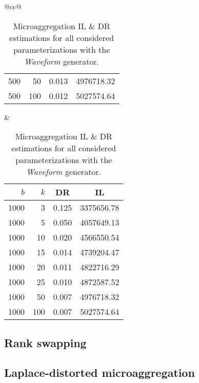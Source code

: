 \begin{table}[H]
\begin{tabular}{@{}cc@{}}
\begin{tabular}{@{}rrrr@{}}
			500  & 50  & 0.013 & 4976718.32 \\
			500  & 100 & 0.012 & 5027574.64 \\ \bottomrule
		\end{tabular}
		&
		\begin{tabular}{@{}rrrr@{}}
			\toprule
			$b$ & $k$ & \multicolumn{1}{c}{DR} & \multicolumn{1}{c}{IL} \\ \midrule
			1000 & 3   & 0.125 & 3375656.78 \\
			1000 & 5   & 0.050 & 4057649.13 \\
			1000 & 10  & 0.020 & 4566550.54 \\
			1000 & 15  & 0.014 & 4739204.47 \\
			1000 & 20  & 0.011 & 4822716.29 \\
			1000 & 25  & 0.010 & 4872587.52 \\
			1000 & 50  & 0.007 & 4976718.32 \\
			1000 & 100 & 0.007 & 5027574.64 \\ \bottomrule
		\end{tabular}
	\end{tabular}
	\caption[Microaggregation DR \& IL estimations (RandomRBF).]{Microaggregation IL \& DR estimations for all considered parameterizations with the \textit{Waveform} generator.}
	\label{table:results-wave-microaggregation}
\end{table}

\subsection{Rank swapping}
\label{Benchmarking:Results:RankSwap}

\subsection{Laplace-distorted microaggregation}
\label{Benchmarking:Results:DiffPriv}